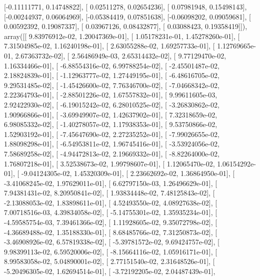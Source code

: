 \documentclass{article}
\begin{document}
       [-0.11111771,  0.14748822],
       [ 0.02511278,  0.02654236],
       [ 0.07981948,  0.15498143],
       [-0.00244937,  0.06064969],
       [-0.05384419,  0.07851638],
       [-0.06098202,  0.09059681],
       [ 0.00592392,  0.19087337],
       [ 0.03967126,  0.08432877],
       [ 0.03088423,  0.19358419]]), array([[  9.83976912e-02,   1.20047369e-01],
       [  1.05178231e-01,   1.45278260e-01],
       [  7.31504985e-02,   1.16240198e-01],
       [  2.63055288e-02,   1.69257733e-01],
       [  1.12769665e-01,   2.67363732e-02],
       [  2.56486949e-03,   2.65314432e-02],
       [  9.77129470e-02,   1.16334466e-01],
       [ -6.88554316e-02,   6.99788254e-02],
       [ -2.45501487e-02,   2.18824839e-01],
       [ -1.12963777e-02,   1.27449195e-01],
       [ -6.48616705e-02,   9.29531485e-02],
       [ -1.45426600e-02,   7.76346700e-02],
       [ -7.04668342e-02,   2.22364793e-01],
       [ -2.88501226e-02,   1.67557832e-01],
       [  9.99611605e-03,   2.92422930e-02],
       [ -6.19015242e-02,   6.28010525e-02],
       [ -3.26830862e-02,   1.90966866e-01],
       [ -3.69949907e-02,   1.42637902e-01],
       [  7.32318659e-02,   6.98085332e-02],
       [ -1.40278057e-02,   1.17938353e-01],
       [  9.53750866e-02,   1.52903192e-01],
       [ -7.45647690e-02,   2.27235252e-01],
       [ -7.99026655e-02,   1.88098298e-01],
       [ -6.54953811e-02,   1.96745416e-01],
       [ -3.53924056e-02,   7.58689258e-02],
       [ -4.94472813e-02,   2.19669332e-01],
       [ -8.82264000e-02,   1.76807218e-01],
       [  3.52538673e-02,   1.99798607e-01],
       [  1.12065470e-02,   1.06154292e-01],
       [ -9.04124305e-02,   1.45320309e-01],
       [  2.23662692e-02,   1.36864950e-01],
       [ -3.41068245e-02,   1.97629011e-01],
       [  6.62797150e-03,   1.26496629e-01],
       [  7.94381431e-02,   8.20950841e-02],
       [  1.93834448e-02,   7.48125843e-02],
       [ -2.13088053e-02,   1.83898611e-01],
       [  4.52493550e-02,   4.08927638e-02],
       [  7.00718516e-03,   4.39834058e-02],
       [ -5.14755301e-02,   1.35935234e-01],
       [ -4.59585754e-03,   7.39461366e-02],
       [  1.11928605e-02,   9.35072798e-02],
       [ -4.36689488e-02,   1.35188330e-01],
       [  8.68485766e-02,   7.31250873e-02],
       [ -3.46908926e-02,   6.57819338e-02],
       [ -5.39781572e-02,   9.69424757e-02],
       [  9.98399113e-02,   6.59520006e-02],
       [ -8.15664116e-02,   1.05916171e-01],
       [  8.99583058e-02,   5.04890001e-02],
       [  2.77151540e-02,   2.31648526e-01],
       [ -5.20496305e-02,   1.62694514e-01],
       [ -3.72192205e-02,   2.04487439e-01],
\end{document}
